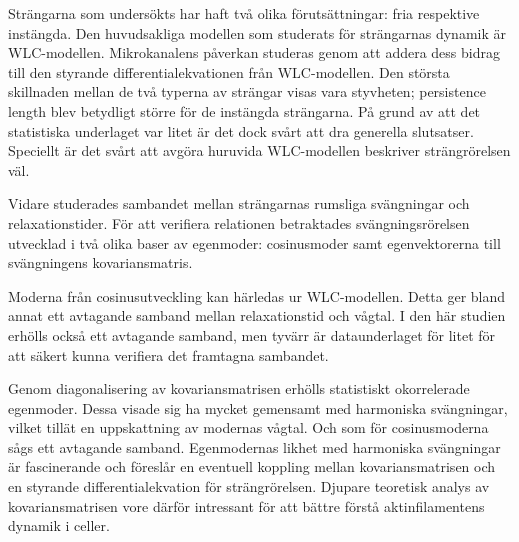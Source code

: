 Strängarna som undersökts har haft två olika förutsättningar: fria respektive instängda. Den huvudsakliga modellen som studerats för strängarnas dynamik är WLC-modellen. Mikrokanalens påverkan studeras genom att addera dess bidrag till den styrande differentialekvationen från WLC-modellen. %
Den största skillnaden mellan de två typerna av strängar visas vara styvheten; persistence length blev betydligt större för de instängda strängarna. %
På grund av att det statistiska underlaget var litet är det dock svårt att dra generella slutsatser. Speciellt är det svårt att avgöra huruvida WLC-modellen beskriver strängrörelsen väl.  

Vidare studerades sambandet mellan strängarnas rumsliga svängningar och relaxationstider. %
För att verifiera relationen betraktades svängningsrörelsen utvecklad i två olika baser av egenmoder: cosinusmoder samt egenvektorerna till svängningens kovariansmatris.

Moderna från cosinusutveckling kan härledas ur WLC-modellen. Detta ger bland annat ett avtagande samband mellan relaxationstid och vågtal. I den här studien erhölls också ett avtagande samband, men tyvärr är dataunderlaget för litet för att säkert kunna verifiera det framtagna sambandet.  

Genom diagonalisering av kovariansmatrisen erhölls statistiskt okorrelerade egenmoder. Dessa visade sig ha mycket gemensamt med harmoniska svängningar, vilket tillät en uppskattning av modernas vågtal. Och som för cosinusmoderna sågs ett avtagande samband. 
Egenmodernas likhet med harmoniska svängningar är fascinerande och föreslår en eventuell koppling mellan kovariansmatrisen och en styrande differentialekvation för strängrörelsen. Djupare teoretisk analys av kovariansmatrisen vore därför intressant för att bättre förstå aktinfilamentens dynamik i celler.

